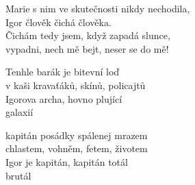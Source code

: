 \cho{}

\ve{}
Marie s nim ve skutečnosti nikdy nechodila,\\
Igor člověk čichá člověka.\\
Čichám tedy jsem, když zapadá slunce,\\
vypadni, nech mě bejt, neser se do mě!

Tenhle barák je bitevní loď\\
v kaši kravaťáků, skínů, policajtů\\
Igorova archa, hovno plující\\
galaxií

kapitán posádky spálenej mrazem\\
chlastem, vohněm, fetem, životem\\
Igor je kapitán, kapitán totál\\
brutál

\cho{}


\esong{}